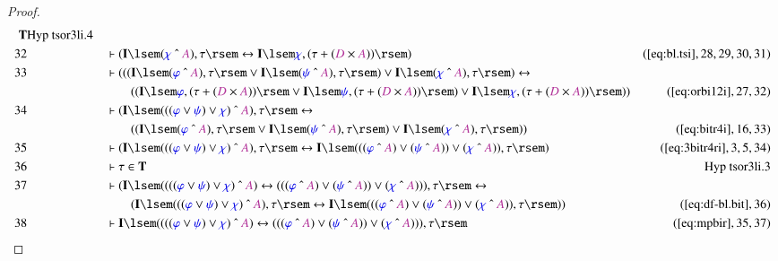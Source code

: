 \begin{proof}
\begin{align}
      \mathbf{T}&\text{Hyp~tsor3li.4}\notag%
  \\ 32 &&  & \vdash ( \mathbf{I} \lsem ( \mw{\chi} ~\string^~ \mc{A} ) , \tau
      \rsem \leftrightarrow \mathbf{I} \lsem \mw{\chi} , (
      \tau + ( \mc{D} \times \mc{A} ) ) \rsem
      )&(\mbox{\ref{eq:bl.tsi}},28,29,30,31)\notag
  \\ 33 &&  & \vdash ( ( ( \mathbf{I} \lsem ( \mw{\varphi} ~\string^~ \mc{A} )
      , \tau \rsem \vee \mathbf{I} \lsem ( \mw{\psi}
      ~\string^~ \mc{A} ) , \tau \rsem ) \vee \mathbf{I}
      \lsem ( \mw{\chi} ~\string^~ \mc{A} ) , \tau \rsem )
      \leftrightarrow  \notag \\ & & & \qquad
     ( ( \mathbf{I} \lsem \mw{\varphi} , (
      \tau + ( \mc{D} \times \mc{A} ) ) \rsem \vee
      \mathbf{I} \lsem \mw{\psi} , ( \tau + ( \mc{D} \times
      \mc{A} ) ) \rsem ) \vee \mathbf{I} \lsem \mw{\chi} ,
      ( \tau + ( \mc{D} \times \mc{A} ) ) \rsem )
      )&(\mbox{\ref{eq:orbi12i}},27,32)\notag
  \\ 34 &&  & \vdash ( \mathbf{I} \lsem ( ( ( \mw{\varphi} \vee \mw{\psi} )
      \vee \mw{\chi} ) ~\string^~ \mc{A} ) , \tau \rsem
      \leftrightarrow  \notag \\ & & & \qquad
     ( ( \mathbf{I} \lsem ( \mw{\varphi}
      ~\string^~ \mc{A} ) , \tau \rsem \vee \mathbf{I}
      \lsem ( \mw{\psi} ~\string^~ \mc{A} ) , \tau \rsem )
      \vee \mathbf{I} \lsem ( \mw{\chi} ~\string^~ \mc{A} )
      , \tau \rsem ) )&(\mbox{\ref{eq:bitr4i}},16,33)\notag
  \\ 35 &&  & \vdash ( \mathbf{I} \lsem ( ( ( \mw{\varphi} \vee \mw{\psi} )
      \vee \mw{\chi} ) ~\string^~ \mc{A} ) , \tau \rsem
      \leftrightarrow \mathbf{I} \lsem ( ( ( \mw{\varphi}
      ~\string^~ \mc{A} ) \vee ( \mw{\psi} ~\string^~
      \mc{A} ) ) \vee ( \mw{\chi} ~\string^~ \mc{A} ) ) ,
      \tau \rsem )&(\mbox{\ref{eq:3bitr4ri}},3,5,34)\notag
  \\ 36 &&  & \vdash \tau \in
      \mathbf{T}&\text{Hyp~tsor3li.3}\notag%
  \\ 37 &&  & \vdash ( \mathbf{I} \lsem ( ( ( ( \mw{\varphi} \vee \mw{\psi} )
      \vee \mw{\chi} ) ~\string^~ \mc{A} ) \leftrightarrow
      ( ( ( \mw{\varphi} ~\string^~ \mc{A} ) \vee (
      \mw{\psi} ~\string^~ \mc{A} ) ) \vee ( \mw{\chi}
      ~\string^~ \mc{A} ) ) ) , \tau \rsem \leftrightarrow \notag \\ & & & \qquad
      ( \mathbf{I} \lsem ( ( ( \mw{\varphi} \vee \mw{\psi}
      ) \vee \mw{\chi} ) ~\string^~ \mc{A} ) , \tau \rsem
      \leftrightarrow \mathbf{I} \lsem ( ( ( \mw{\varphi}
      ~\string^~ \mc{A} ) \vee ( \mw{\psi} ~\string^~
      \mc{A} ) ) \vee ( \mw{\chi} ~\string^~ \mc{A} ) ) ,
      \tau \rsem ) )&(\mbox{\ref{eq:df-bl.bit}},36)\notag
  \\ 38 &&  & \vdash \mathbf{I} \lsem ( ( ( ( \mw{\varphi} \vee \mw{\psi} )
      \vee \mw{\chi} ) ~\string^~ \mc{A} ) \leftrightarrow
      ( ( ( \mw{\varphi} ~\string^~ \mc{A} ) \vee (
      \mw{\psi} ~\string^~ \mc{A} ) ) \vee ( \mw{\chi}
      ~\string^~ \mc{A} ) ) ) , \tau
      \rsem&(\mbox{\ref{eq:mpbir}},35,37)\notag
\end{align}
\end{proof}

